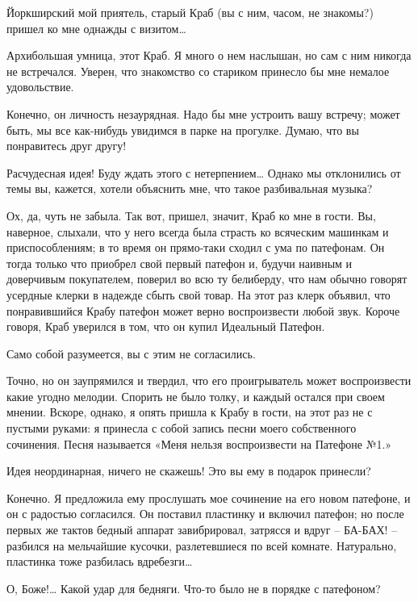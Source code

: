 \documentclass[../main.tex]{subfiles}
\begin{document}
\begin{dialogue}
 Йоркширский мой приятель, старый Краб (вы с ним, часом, не знакомы?) пришел ко мне однажды с визитом\ldots{}

 {\Large А}рхибольшая умница, этот Краб. Я много о нем наслышан, но сам с ним никогда не встречался. Уверен, что знакомство со стариком принесло бы мне немалое удовольствие.

 Конечно, он личность незаурядная. Надо бы мне устроить вашу встречу; может быть, мы все как-нибудь увидимся в парке на прогулке. Думаю, что вы понравитесь друг другу!

 Расчудесная идея! Буду ждать этого с нетерпением\ldots{} Однако мы отклонились от темы вы, кажется, хотели объяснить мне, что такое разбивальная музыка?

 Ох, да, чуть не забыла. Так вот, пришел, значит, Краб ко мне в гости. Вы, наверное, слыхали, что у него всегда была страсть ко всяческим машинкам и приспособлениям; в то время он прямо-таки сходил с ума по патефонам. Он тогда только что приобрел свой первый патефон и, будучи наивным и доверчивым покупателем, поверил во всю ту белиберду, что нам обычно говорят усердные клерки в надежде сбыть свой товар. На этот раз клерк объявил, что понравившийся Крабу патефон может верно воспроизвести любой звук. Короче говоря, Краб уверился в том, что он купил Идеальный Патефон.

 Само собой разумеется, вы с этим не согласились.

 Точно, но он заупрямился и твердил, что его проигрыватель может воспроизвести какие угодно мелодии. Спорить не было толку, и каждый остался при своем мнении. Вскоре, однако, я опять пришла к Крабу в гости, на этот раз не с пустыми руками: я принесла с собой запись песни моего собственного сочинения. Песня называется «Меня нельзя воспроизвести на Патефоне №1.»

 Идея неординарная, ничего не скажешь! Это вы ему в подарок принесли?

 Конечно. Я предложила ему прослушать мое сочинение на его новом патефоне, и он с радостью согласился. Он поставил пластинку и включил патефон; но после первых же тактов бедный аппарат завибрировал, затрясся и вдруг \--- БА-БАХ! \--- разбился на мельчайшие кусочки, разлетевшиеся по всей комнате. Натурально, пластинка тоже разбилась вдребезги\ldots{}

 О, Боже!\ldots{} Какой удар для бедняги. Что-то было не в порядке с патефоном?


\end{dialogue}
\end{document}
